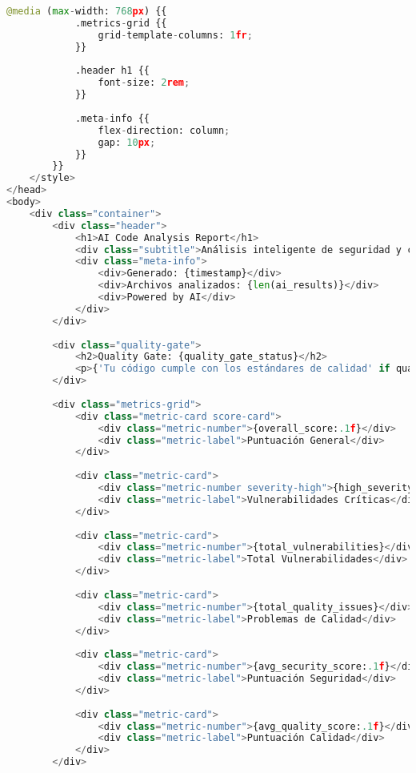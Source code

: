 \begin{lstlisting}[language=python, caption={Contenido completo del script ai\_analyzer.py.}, label={lst:python_script}]
        @media (max-width: 768px) {{
            .metrics-grid {{
                grid-template-columns: 1fr;
            }}
            
            .header h1 {{
                font-size: 2rem;
            }}
            
            .meta-info {{
                flex-direction: column;
                gap: 10px;
            }}
        }}
    </style>
</head>
<body>
    <div class="container">
        <div class="header">
            <h1>AI Code Analysis Report</h1>
            <div class="subtitle">Análisis inteligente de seguridad y calidad de código</div>
            <div class="meta-info">
                <div>Generado: {timestamp}</div>
                <div>Archivos analizados: {len(ai_results)}</div>
                <div>Powered by AI</div>
            </div>
        </div>
        
        <div class="quality-gate">
            <h2>Quality Gate: {quality_gate_status}</h2>
            <p>{'Tu código cumple con los estándares de calidad' if quality_gate_status == 'PASSED' else 'Se requieren mejoras antes de producción'}</p>
        </div>
        
        <div class="metrics-grid">
            <div class="metric-card score-card">
                <div class="metric-number">{overall_score:.1f}</div>
                <div class="metric-label">Puntuación General</div>
            </div>
            
            <div class="metric-card">
                <div class="metric-number severity-high">{high_severity_vulns}</div>
                <div class="metric-label">Vulnerabilidades Críticas</div>
            </div>
            
            <div class="metric-card">
                <div class="metric-number">{total_vulnerabilities}</div>
                <div class="metric-label">Total Vulnerabilidades</div>
            </div>
            
            <div class="metric-card">
                <div class="metric-number">{total_quality_issues}</div>
                <div class="metric-label">Problemas de Calidad</div>
            </div>
            
            <div class="metric-card">
                <div class="metric-number">{avg_security_score:.1f}</div>
                <div class="metric-label">Puntuación Seguridad</div>
            </div>
            
            <div class="metric-card">
                <div class="metric-number">{avg_quality_score:.1f}</div>
                <div class="metric-label">Puntuación Calidad</div>
            </div>
        </div>
        

\end{lstlisting}
